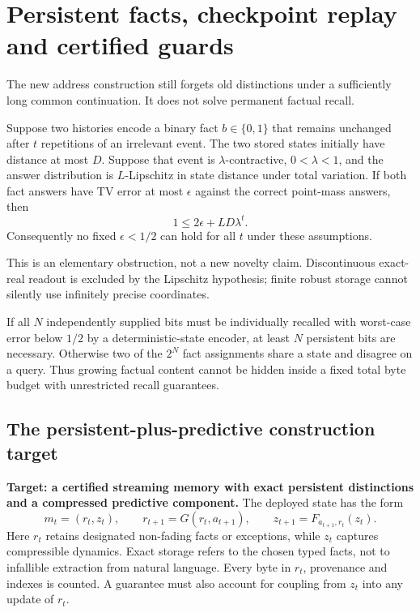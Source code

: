 \section{Persistent facts, checkpoint replay and certified guards}\label{III:M:audit:sec:persistent}
The new address construction still forgets old distinctions under a sufficiently
long common continuation. It does not solve permanent factual recall.

\begin{proposition}
Suppose two histories encode a binary fact $b\in\{0,1\}$ that remains unchanged
after $t$ repetitions of an irrelevant event. The two stored states initially
have distance at most $D$. Suppose that event is $\lambda$-contractive,
$0<\lambda<1$, and the answer distribution is $L$-Lipschitz in state distance
under total variation. If both fact answers have TV error at most $\epsilon$
against the correct point-mass answers, then
\[
 1\le 2\epsilon+LD\lambda^t.
\]
Consequently no fixed $\epsilon<1/2$ can hold for all $t$ under these assumptions.
\end{proposition}

This is an elementary obstruction, not a new novelty claim. Discontinuous
exact-real readout is excluded by the Lipschitz hypothesis; finite robust
storage cannot silently use infinitely precise coordinates.

If all $N$ independently supplied bits must be individually recalled with
worst-case error below $1/2$ by a deterministic-state encoder, at least $N$
persistent bits are necessary. Otherwise two of the $2^N$ fact assignments
share a state and disagree on a query. Thus growing factual content cannot be
hidden inside a fixed total byte budget with unrestricted recall guarantees.

\subsection{The persistent-plus-predictive construction target}
\textbf{Target: a certified streaming memory with exact persistent distinctions
and a compressed predictive component.} The deployed state has the form
\[
 m_t=(r_t,z_t),\qquad
 r_{t+1}=G(r_t,a_{t+1}),\qquad z_{t+1}=F_{a_{t+1},r_t}(z_t).
\]
Here $r_t$ retains designated non-fading facts or exceptions, while $z_t$
captures compressible dynamics. Exact storage refers to the chosen typed
facts, not to infallible extraction from natural language. Every byte in
$r_t$, provenance and indexes is counted. A guarantee must also account for
coupling from $z_t$ into any update of $r_t$.

